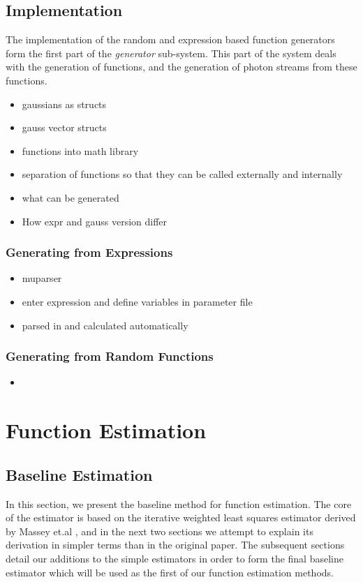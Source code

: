 \documentclass[a4paper,11pt]{article}
\begin{document}
\subsection{Implementation}
\label{sec-5-3}

    The implementation of the random and expression based function generators
    form the first part of the \emph{generator} sub-system. This part of the
    system deals with the generation of functions, and the generation of photon
    streams from these functions.
\begin{itemize}
\item gaussians as structs
\item gauss vector structs
\item functions into math library
\item separation of functions so that they can be called externally and internally
\item what can be generated
\item How expr and gauss version differ
\end{itemize}
\subsubsection{Generating from Expressions}
\label{sec-5-3-1}

\begin{itemize}
\item muparser
\item enter expression and define variables in parameter file
\item parsed in and calculated automatically
\end{itemize}
\subsubsection{Generating from Random Functions}
\label{sec-5-3-2}

\begin{itemize}
\item 
\end{itemize}
\section{Function Estimation}
\label{sec-6}
\subsection{Baseline Estimation}
\label{sec-6-1}

In this section, we present the baseline method for function estimation. The
core of the estimator is based on the iterative weighted least squares estimator
derived by Massey et.al \cite{massey1996estimating}, and in the next two
sections we attempt to explain its derivation in simpler terms than in the
original paper. The subsequent sections detail our additions to the simple
estimators in order to form the final baseline estimator which will be used as
the first of our function estimation methods.
\end{document}
